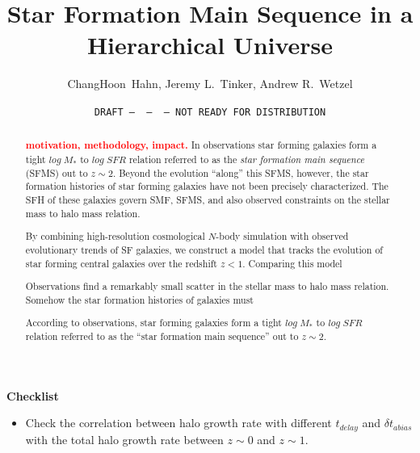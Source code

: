 \documentclass[12pt, letterpaper, preprint]{aastex}
\newcommand{\todo}[1]{{\bf \textcolor{red}{#1}}}
\newcommand{\bitem}{\begin{itemize}}
\newcommand{\eitem}{\end{itemize}}
\begin{document}
\sloppy\sloppypar\frenchspacing

\title{Star Formation Main Sequence in a Hierarchical Universe} 
\date{\texttt{DRAFT~---~\githash~---~\gitdate~---~NOT READY FOR DISTRIBUTION}}
\author{ChangHoon~Hahn, 
Jeremy L.~Tinker, 
Andrew R.~Wetzel}

\begin{abstract}
    \todo{motivation, methodology, impact.}
    In observations star forming galaxies form a tight $log\;M_*$ to $log\;SFR$ 
    relation referred to as the {\em star formation main sequence} (SFMS) out to $z\sim2$. 
    Beyond the evolution ``along'' this SFMS, however, the star formation histories of star 
    forming galaxies have not been precisely characterized. 
    The SFH of these galaxies govern SMF, SFMS, and also observed constraints on the stellar mass to halo mass
    relation. 

    By combining high-resolution cosmological $N$-body simulation with observed evolutionary 
    trends of SF galaxies, we construct a model that tracks the evolution of star forming 
    central galaxies over the redshift $z < 1$. Comparing this model 

    Observations find a remarkably small scatter in the stellar mass to halo mass relation. 
    Somehow the star formation histories of galaxies must 
    
    According to observations, star forming galaxies form a tight $log\;M_*$ to $log\;SFR$ 
    relation referred to as the ``star formation main sequence'' out to $z\sim2$. 
\end{abstract}


{\bf Checklist} 
\bitem
\item Check the correlation between halo growth rate with different $t_{delay}$ and $\delta t_{abias}$ with the total halo growth rate between $z \sim 0$ and $z \sim 1$. 
\eitem 
\end{document}
